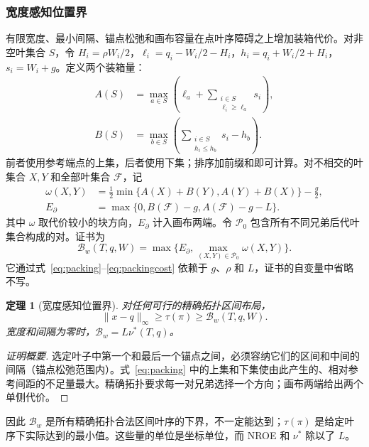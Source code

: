 \documentclass[fontset=none,zihao=5,a4paper]{ctexart}
\newtheorem{theorem}{定理}
\begin{document}
\subsubsection{宽度感知位置界}
有限宽度、最小间隔、锚点松弛和画布容量在点叶序障碍之上增加装箱代价。对非空叶集合 $S$，令 $H_i=\rho W_i/2$，$\ell_i=q_i-W_i/2-H_i$，$h_i=q_i+W_i/2+H_i$，$s_i=W_i+g$。定义两个装箱量：
\begin{equation}\label{eq:packing}
\begin{aligned}
 A(S)&=\max_{a\in S}\left(\ell_a+\sum_{\substack{i\in S\\\ell_i\ge\ell_a}}s_i\right),\\
 B(S)&=\max_{b\in S}\left(\sum_{\substack{i\in S\\h_i\le h_b}}s_i-h_b\right).
\end{aligned}
\end{equation}
前者使用参考端点的上集，后者使用下集；排序加前缀和即可计算。对不相交的叶集合 $X,Y$ 和全部叶集合 $\mathcal{F}$，记
\begin{equation}\label{eq:packingcost}
\begin{aligned}
 \omega(X,Y)&=\tfrac12\min\{A(X)+B(Y),A(Y)+B(X)\}-\tfrac g2,\\
 E_\partial&=\max\{0,B(\mathcal{F})-g,A(\mathcal{F})-g-L\}.
\end{aligned}
\end{equation}
其中 $\omega$ 取代价较小的块方向，$E_\partial$ 计入画布两端。令 $\mathcal{P}_0$ 包含所有不同兄弟后代叶集合构成的对。证书为
\begin{equation}\label{eq:bwdef}
 \mathcal{B}_w(T,q,W)=\max\{E_\partial,\max_{(X,Y)\in\mathcal{P}_0}\omega(X,Y)\}.
\end{equation}
它通过式~\eqref{eq:packing}--\eqref{eq:packingcost} 依赖于 $g$、$\rho$ 和 $L$，证书的自变量中省略不写。
\begin{theorem}[宽度感知位置界]\label{thm:width}
对任何可行的精确拓扑区间布局，
\begin{equation}\label{eq:widthbound}
 \|x-q\|_\infty\ge\tau(\pi)\ge\mathcal{B}_w(T,q,W).
\end{equation}
宽度和间隔为零时，$\mathcal{B}_w=L\nu^*(T,q)$。
\end{theorem}
\begin{proof}[证明概要]
选定叶子中第一个和最后一个锚点之间，必须容纳它们的区间和中间的间隔（锚点松弛范围内）。式~\eqref{eq:packing} 中的上集和下集使由此产生的、相对参考间距的不足量最大。精确拓扑要求每一对兄弟选择一个方向；画布两端给出两个单侧代价。
\end{proof}
因此 $\mathcal{B}_w$ 是所有精确拓扑合法区间叶序的下界，不一定能达到；$\tau(\pi)$ 是给定叶序下实际达到的最小值。这些量的单位是坐标单位，而 NROE 和 $\nu^*$ 除以了 $L$。
\end{document}
